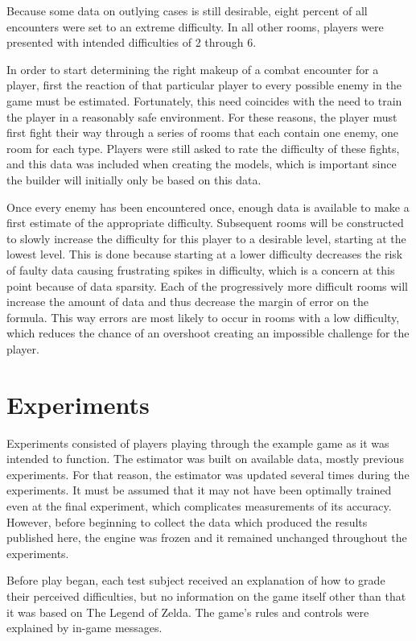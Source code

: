 \documentclass[a4paper]{article}
\begin{document}
\begin{multicols*}{2}
Because some data on outlying cases is still desirable, eight percent of all encounters were set to an extreme difficulty. In all other rooms, players were presented with intended difficulties of 2 through 6.

In order to start determining the right makeup of a combat encounter for a player, first the reaction of that particular player to every possible enemy in the game must be estimated. Fortunately, this need coincides with the need to train the player in a reasonably safe environment. For these reasons, the player must first fight their way through a series of rooms that each contain one enemy, one room for each type. Players were still asked to rate the difficulty of these fights, and this data was included when creating the models, which is important since the builder will initially only be based on this data.

Once every enemy has been encountered once, enough data is available to make a first estimate of the appropriate difficulty. Subsequent rooms will be constructed to slowly increase the difficulty for this player to a desirable level, starting at the lowest level. This is done because starting at a lower difficulty decreases the risk of faulty data causing frustrating spikes in difficulty, which is a concern at this point because of data sparsity. Each of the progressively more difficult rooms will increase the amount of data and thus decrease the margin of error on the formula. This way errors are most likely to occur in rooms with a low difficulty, which reduces the chance of an overshoot creating an impossible challenge for the player.

\section{Experiments}
Experiments consisted of players playing through the example game as it was intended to function. The estimator was built on available data, mostly previous experiments. For that reason, the estimator was updated several times during the experiments. It must be assumed that it may not have been optimally trained even at the final experiment, which complicates measurements of its accuracy. However, before beginning to collect the data which produced the results published here, the engine was frozen and it remained unchanged throughout the experiments.

Before play began, each test subject received an explanation of how to grade their perceived difficulties, but no information on the game itself other than that it was based on The Legend of Zelda. The game's rules and controls were explained by in-game messages.


\end{multicols*}
\end{document}
